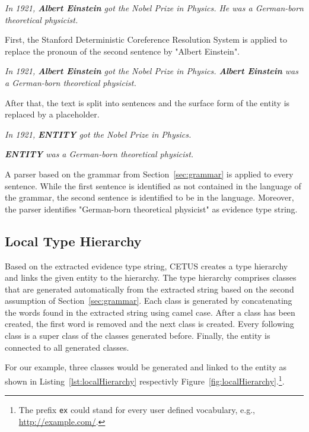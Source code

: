\begin{center}
\emph{In 1921, \textbf{Albert Einstein} got the Nobel Prize in Physics. He was a German-born theoretical physicist.}
\end{center}

First, the Stanford Deterministic Coreference Resolution System is applied to replace the pronoun of the second sentence by "Albert Einstein".

\begin{center}
\emph{In 1921, \textbf{Albert Einstein} got the Nobel Prize in Physics. \textbf{Albert Einstein} was a German-born theoretical physicist.}
\end{center}

After that, the text is split into sentences and the surface form of the entity is replaced by a placeholder.

\begin{center}
\emph{In 1921, \textbf{ENTITY} got the Nobel Prize in Physics.}

\emph{\textbf{ENTITY} was a German-born theoretical physicist.}
\end{center}

A parser based on the grammar from Section~\ref{sec:grammar} is applied to every sentence.
While the first sentence is identified as not contained in the language of the grammar, the second sentence is identified to be in the language.
Moreover, the parser identifies "German-born theoretical physicist" as evidence type string.

\subsection{Local Type Hierarchy}

Based on the extracted evidence type string, CETUS creates a type hierarchy and links the given entity to the hierarchy.
The type hierarchy comprises classes that are generated automatically from the extracted string based on the second assumption of Section~\ref{sec:grammar}.
Each class is generated by concatenating the words found in the extracted string using camel case.
After a class has been created, the first word is removed and the next class is created.
Every following class is a super class of the classes generated before.
Finally, the entity is connected to all generated classes.

For our example, three classes would be generated and linked to the entity as shown in Listing~\ref{lst:localHierarchy} respectivly Figure~\ref{fig:localHierarchy}.\footnote{The prefix \texttt{ex} could stand for every user defined vocabulary, e.g., \url{http://example.com/}.}.


